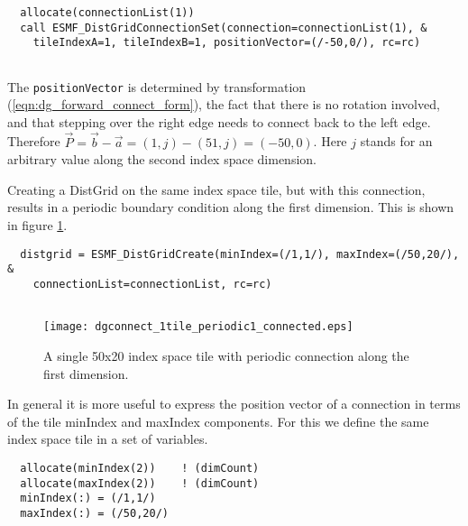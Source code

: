  \begin{verbatim}
  allocate(connectionList(1))
  call ESMF_DistGridConnectionSet(connection=connectionList(1), &
    tileIndexA=1, tileIndexB=1, positionVector=(/-50,0/), rc=rc)
 
\end{verbatim}
 

   The {\tt positionVector} is determined by transformation 
   (\ref{eqn:dg_forward_connect_form}), the fact that there is no rotation 
   involved, and that stepping over the right edge needs to connect back to
   the left edge. Therefore $\vec P = \vec b - \vec a = (1,j) - (51,j) = 
   (-50,0)$. Here $j$ stands for an arbitrary value along the second index 
   space dimension.
   
   Creating a DistGrid on the same index space tile, but with this connection,
   results in a periodic boundary condition along the first dimension.
   This is shown in figure \ref{fig:dgconnect_1tile_periodic1_connected}. 
   

 \begin{verbatim}
  distgrid = ESMF_DistGridCreate(minIndex=(/1,1/), maxIndex=(/50,20/), &
    connectionList=connectionList, rc=rc)
 
\end{verbatim}
 
 

  
   \begin{figure}[h]
     \caption{A single 50x20 index space tile with periodic connection along
       the first dimension.}
     \centering
     \texttt{[image: dgconnect\_1tile\_periodic1\_connected.eps]}
     \label{fig:dgconnect_1tile_periodic1_connected}
   \end{figure}
  
   
   In general it is more useful to express the position vector of a connection
   in terms of the tile minIndex and maxIndex components. For this we define the
   same index space tile in a set of variables. 

 \begin{verbatim}
  allocate(minIndex(2))    ! (dimCount)
  allocate(maxIndex(2))    ! (dimCount)
  minIndex(:) = (/1,1/)
  maxIndex(:) = (/50,20/)
 
\end{verbatim}
 
